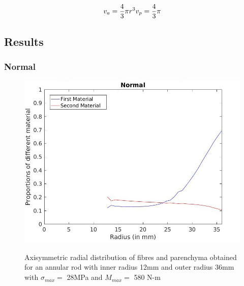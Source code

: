 \documentclass[10pt]{article}
\begin{document}
\begin{equation*}
v_a = \frac{4}{3}\pi r^3\\
v_p = \frac{4}{3}\pi 
\end{equation*}
\subsection{Results}
\subsubsection{Normal}
\begin{figure}[H]
\begin{center}
	\includegraphics[scale=0.3]{./Plots/normal/a77_1.jpg}
	\label{fig:radial}
	\caption{Axisymmetric radial distribution of fibres and parenchyma obtained for an annular rod with inner radius 12mm and outer radius 36mm with $\sigma_{max} = $ 28MPa and $M_{max} = $ 580 N-m}
\end{center}
\end{figure}
\end{document}
